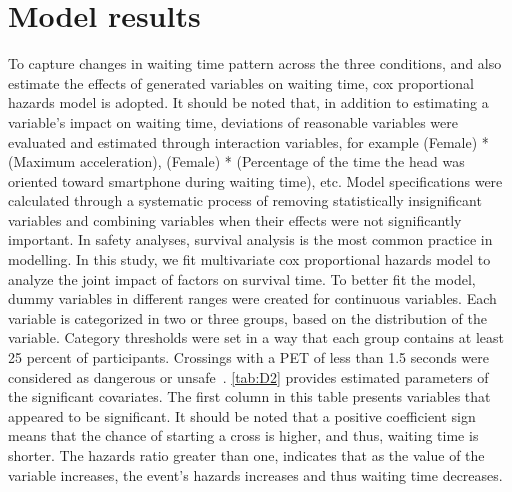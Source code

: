 \section{Model results}
\label{S:D6}
To capture changes in waiting time pattern across the three conditions, and also estimate the effects of generated variables on waiting time, cox proportional hazards model is adopted. It should be noted that, in addition to estimating a variable’s impact on waiting time, deviations of reasonable variables were evaluated and estimated through interaction variables, for example (Female) * (Maximum acceleration), (Female) * (Percentage of the time the head was oriented toward smartphone during waiting time), etc. Model specifications were calculated through a systematic process of removing statistically insignificant variables and combining variables when their effects were not significantly important. In safety analyses, survival analysis is the most common practice in modelling. In this study, we fit multivariate cox proportional hazards model to analyze the joint impact of factors on survival time. To better fit the model, dummy variables in different ranges were created for continuous variables. Each variable is categorized in two or three groups, based on the distribution of the variable. Category thresholds were set in a way that each group contains at least 25 percent of participants. Crossings with a PET of less than 1.5 seconds were considered as dangerous or unsafe~\cite{zaki2016exploring}. \cref{tab:D2} provides estimated parameters of the significant covariates. The first column in this table presents variables that appeared to be significant. It should be noted that a positive coefficient sign means that the chance of starting a cross is higher, and thus, waiting time is shorter. The hazards ratio greater than one, indicates that as the value of the variable increases, the event’s hazards increases and thus waiting time decreases.

